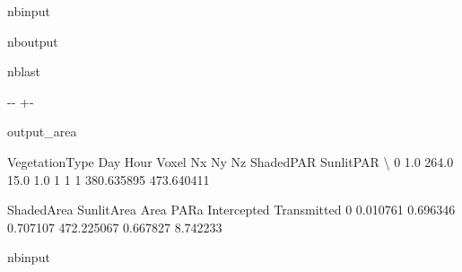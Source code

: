 \documentclass[letterpaper,10pt,english]{sphinxmanual}
\begin{document}
\begin{sphinxuseclass}{nbinput}
{
\begin{sphinxVerbatim}[commandchars=\\\{\}]
\llap{\color{nbsphinxin}[13]:\,\hspace{\fboxrule}\hspace{\fboxsep}}
\end{sphinxVerbatim}
}

\end{sphinxuseclass}
\begin{sphinxuseclass}{nboutput}
\begin{sphinxuseclass}{nblast}
{

\kern-\sphinxverbatimsmallskipamount\kern-\baselineskip
\kern+\FrameHeightAdjust\kern-\fboxrule
\vspace{\nbsphinxcodecellspacing}

\begin{sphinxuseclass}{output_area}
\begin{sphinxuseclass}{}


\begin{sphinxVerbatim}[commandchars=\\\{\}]
   VegetationType    Day  Hour  Voxel  Nx  Ny  Nz   ShadedPAR   SunlitPAR  \textbackslash{}
0             1.0  264.0  15.0    1.0   1   1   1  380.635895  473.640411

   ShadedArea  SunlitArea      Area        PARa  Intercepted  Transmitted
0    0.010761    0.696346  0.707107  472.225067     0.667827     8.742233
\end{sphinxVerbatim}



\end{sphinxuseclass}
\end{sphinxuseclass}
}

\end{sphinxuseclass}
\end{sphinxuseclass}
\begin{sphinxuseclass}{nbinput}
{
\begin{sphinxVerbatim}[commandchars=\\\{\}]
\llap{\color{nbsphinxin}[14]:\,\hspace{\fboxrule}\hspace{\fboxsep}}
\end{sphinxVerbatim}
}

\end{sphinxuseclass}
\end{document}
